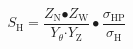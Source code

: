 \[S_{\mathrm{H}}\mathrm{=}\frac{Z_{\mathrm{N}}\mathrm{\bullet }Z_{\mathrm{W}}}{Y_{\theta }\mathrm{\cdot }Y_{\mathrm{Z}}}\bullet \frac{{\sigma }_{\mathrm{HP}}}{{\sigma }_{\mathrm{H}}}\]
